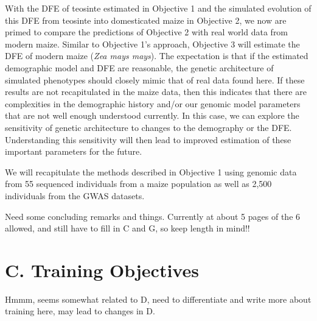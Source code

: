 With the DFE of teosinte estimated in Objective 1 and the simulated evolution of this DFE from teosinte into domesticated maize in Objective 2, we now are primed to compare the predictions of Objective 2 with real world data from modern maize. Similar to Objective 1's approach, Objective 3 will estimate the DFE of modern maize (\emph{Zea mays mays}). The expectation is that if the estimated demographic model and DFE are reasonable, the genetic architecture of simulated phenotypes should closely mimic that of real data found here. If these results are not recapitulated in the maize data, then this indicates that there are complexities in the demographic history and\//or our genomic model parameters that are not well enough understood currently. In this case, we can explore the sensitivity of genetic architecture to changes to the demography or the DFE. Understanding this sensitivity will then lead to improved estimation of these important parameters for the future.

We will recapitulate the methods described in Objective 1 using genomic data from 55 sequenced individuals from a maize population as well as 2,500 individuals from the GWAS datasets.

Need some concluding remarks and things. Currently at about 5 pages of the 6 allowed, and still have to fill in C and G, so keep length in mind!!
	
	
	
	
	
	
	
	
	
\section*{C. Training Objectives}

Hmmm, seems somewhat related to D, need to differentiate and write more about training here, may lead to changes in D.

